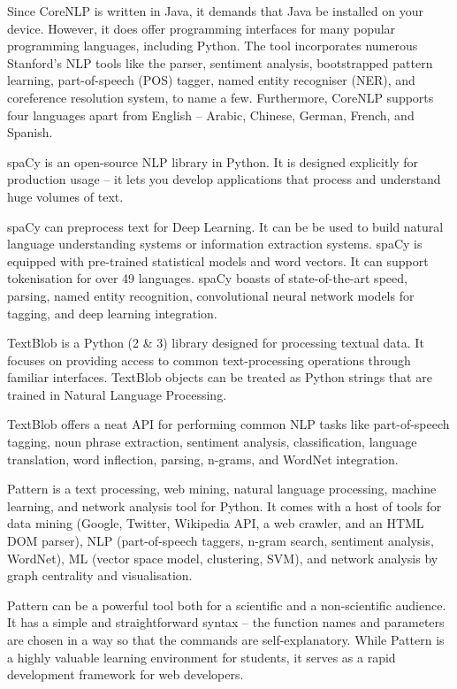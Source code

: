 	Since CoreNLP is written in Java, it demands that Java be installed on your device. However, it does offer programming interfaces for many popular programming languages, including Python. The tool incorporates numerous Stanford’s NLP tools like the parser, sentiment analysis, bootstrapped pattern learning, part-of-speech (POS) tagger, named entity recogniser (NER), and coreference resolution system, to name a few. Furthermore, CoreNLP supports four languages apart from English – Arabic, Chinese, German, French, and Spanish.
	
	spaCy is an open-source NLP library in Python. It is designed explicitly for production usage – it lets you develop applications that process and understand huge volumes of text. 
	
	spaCy can preprocess text for Deep Learning. It can be be used to build natural language understanding systems or information extraction systems. spaCy is equipped with pre-trained statistical models and word vectors. It can support tokenisation for over 49 languages. spaCy boasts of state-of-the-art speed, parsing, named entity recognition, convolutional neural network models for tagging, and deep learning integration.
	
	TextBlob is a Python (2 \& 3) library designed for processing textual data. It focuses on providing access to common text-processing operations through familiar interfaces. TextBlob objects can be treated as Python strings that are trained in Natural Language Processing.
	
	TextBlob offers a neat API for performing common NLP tasks like part-of-speech tagging, noun phrase extraction, sentiment analysis, classification, language translation, word inflection, parsing, n-grams, and WordNet integration.
	
	Pattern is a text processing, web mining, natural language processing, machine learning, and network analysis tool for Python. It comes with a host of tools for data mining (Google, Twitter, Wikipedia API, a web crawler, and an HTML DOM parser), NLP (part-of-speech taggers, n-gram search, sentiment analysis, WordNet), ML (vector space model, clustering, SVM), and network analysis by graph centrality and visualisation. 
	
	Pattern can be a powerful tool both for a scientific and a non-scientific audience. It has a simple and straightforward syntax – the function names and parameters are chosen in a way so that the commands are self-explanatory. While Pattern is a highly valuable learning environment for students, it serves as a rapid development framework for web developers.
	
